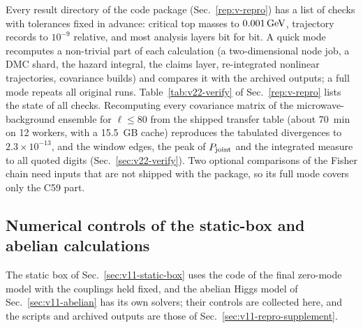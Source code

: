 Every result directory of the code package (Sec.~\ref{rep:v-repro}) has a list of checks with tolerances fixed in advance: critical top masses to $0.001\,\mathrm{GeV}$, trajectory records to $10^{-9}$ relative, and most analysis layers bit for bit.
A quick mode recomputes a non-trivial part of each calculation (a two-dimensional node job, a DMC shard, the hazard integral, the claims layer, re-integrated nonlinear trajectories, covariance builds) and compares it with the archived outputs; a full mode repeats all original runs.
Table~\ref{tab:v22-verify} of Sec.~\ref{rep:v-repro} lists the state of all checks.
Recomputing every covariance matrix of the microwave-background ensemble for $\ell\le80$ from the shipped transfer table (about 70~min on 12 workers, with a 15.5~GB cache) reproduces the tabulated divergences to $2.3\times10^{-13}$, and the window edges, the peak of $P_{\rm joint}$ and the integrated measure to all quoted digits (Sec.~\ref{sec:v22-verify}). %
Two optional comparisons of the Fisher chain need inputs that are not shipped with the package, so its full mode covers only the C59 part.

\subsection{Numerical controls of the static-box and abelian calculations}\label{sec:v11-numerics}

The static box of Sec.~\ref{sec:v11-static-box} uses the code of the final zero-mode model with the couplings held fixed, and the abelian Higgs model of Sec.~\ref{sec:v11-abelian} has its own solvers; their controls are collected here, and the scripts and archived outputs are those of Sec.~\ref{sec:v11-repro-supplement}.


